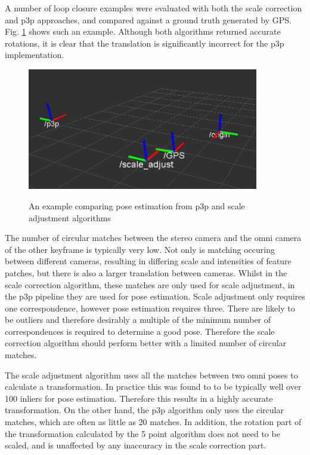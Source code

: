 A number of loop closure examples were evaluated with both the scale correction and p3p approaches, and compared against a ground truth generated by GPS.  Fig. \ref{fig:scale_vs_p3p} shows such an example.  Although both algorithms returned accurate rotations, it is clear that the translation is significantly incorrect for the p3p implementation.

\begin{figure}[h]
  \centering
    \includegraphics[width=0.9\textwidth]{chapters/images/scale_vs_p3p_1}\\
  \caption{An example comparing pose estimation from p3p and scale adjustment algorithms}
  \label{fig:scale_vs_p3p}
\end{figure}

The number of circular matches between the stereo camera and the omni camera of the other keyframe is typically very low.  Not only is matching occuring between different cameras, resulting in differing scale and intensities of feature patches, but there is also a larger translation between cameras. Whilst in the scale correction algorithm, these matches are only used for scale adjustment, in the p3p pipeline they are used for pose estimation.  Scale adjustment only requires one correspondence, however pose estimation requires three.  There are likely to be outliers and therefore desirably a multiple of the minimum number of correspondences is required to determine a good pose.  Therefore the scale correction algorithm should perform better with a limited number of circular matches. 

The scale adjustment algorithm uses all the matches between two omni poses to calculate a transformation.  In practice this was found to to be typically well over 100 inliers for pose estimation.  Therefore this results in a highly accurate transformation.  On the other hand, the p3p algorithm only uses the circular matches, which are often as little as 20 matches.  In addition, the rotation part of the transformation calculated by the 5 point algorithm does not need to be scaled, and is unaffected by any inaccuracy in the scale correction part.



